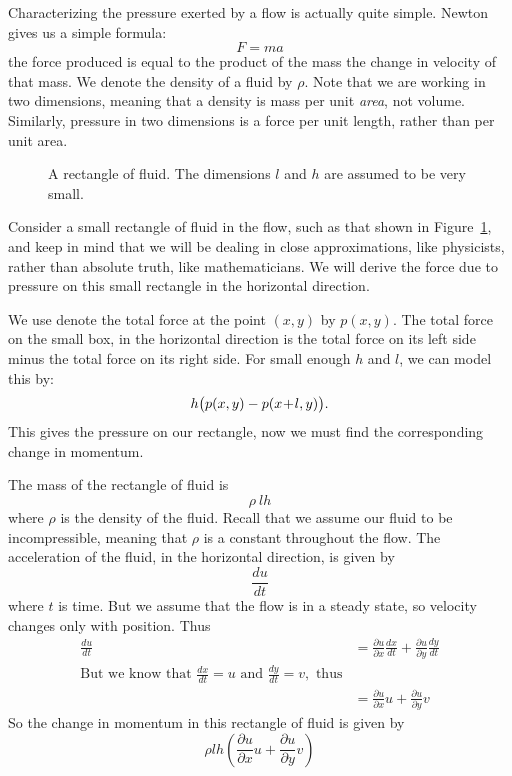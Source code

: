 \documentclass[letterpaper, twoside, 12 pt]{article}
\begin{document}
	Characterizing the pressure exerted by a flow is actually quite simple.
	Newton gives us a simple formula:
	\[
		F = ma
	\]
	the force produced is equal to the product of the mass the change in velocity of that mass.
	We denote the density of a fluid by $\rho$.
	Note that we are working in two dimensions, meaning that a density is mass per unit \textit{area}, not volume.
	Similarly, pressure in two dimensions is a force per unit length, rather than per unit area.


	\begin{figure}[H]
		\centering
		\begin{tikzpicture}
			
		\end{tikzpicture}
		\captionsetup{width = 0.5 \textwidth}
		\caption{
			A rectangle of fluid.
			The dimensions $l$ and $h$ are assumed to be very small.
		}
		\label{fig:pressure_rectangle}
	\end{figure}

	Consider a small rectangle of fluid in the flow, such as that shown in Figure~\ref{fig:pressure_rectangle}, and keep in mind that we will be dealing in close approximations, like physicists, rather than absolute truth, like mathematicians.
	We will derive the force due to pressure on this small rectangle in the horizontal direction.
	
	We use denote the total force at the point $(x, y)$ by $p(x, y)$.
	The total force on the small box, in the horizontal direction is the total force on its left side minus the total force on its right side.
	For small enough $h$ and $l$, we can model this by:
	\[
		h \big( p(x, y) - p(x \tp l, y) \big).
	\]
	This gives the pressure on our rectangle, now we must find the corresponding change in momentum.

	The mass of the rectangle of fluid is
	\[
		\rho \> lh
	\]
	where $\rho$ is the density of the fluid.
	Recall that we assume our fluid to be incompressible, meaning that $\rho$ is a constant throughout the flow.
	The acceleration of the fluid, in the horizontal direction, is given by 
	\[
		\frac{du}{dt}
	\]
	where $t$ is time.
	But we assume that the flow is in a steady state, so velocity changes only with position.
	Thus
	\begin{align*}
	\frac{du}{dt} &= \frac{\partial u}{\partial x} \frac{dx}{dt} + \frac{\partial u}{\partial y} \frac{dy}{dt} \\
	\text{But we know that } \frac{dx}{dt} = u \text{ and } \frac{dy}{dt} = v, \text{ thus}\\
	&= \frac{\partial u}{\partial x} u + \frac{\partial u}{\partial y} v
	\end{align*}
	So the change in momentum in this rectangle of fluid is given by
	\[
		\rho lh \left( \frac{\partial u}{\partial x} u + \frac{\partial u}{\partial y} v \right)
	\]
\end{document}
